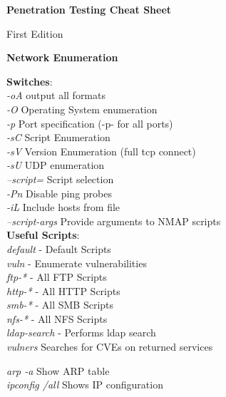 \documentclass[a4paper,10pt]{article}
\begin{document}
\centering
\begin{tcolorbox}[width=0.75\linewidth]
	\huge
	\centering
	\textbf{Penetration Testing Cheat Sheet}
\end{tcolorbox}
\vfill
\begin{tcolorbox}[width=0.6\linewidth]
	\centering
	\large
	First Edition
\end{tcolorbox}
\clearpage
\Huge{\textbf{Network Enumeration}}
\newline
\normalsize
\begin{multicols}{2}
\begin{tcolorbox}[breakable, title=Nmap]
\textbf{Switches}:\\
\textit{-oA} output all formats\\
\textit{-O} Operating System enumeration\\
\textit{-p} Port specification (-p- for all ports)\\
\textit{-sC} Script Enumeration\\
\textit{-sV} Version Enumeration (full tcp connect)\\
\textit{-sU} UDP enumeration\\
\textit{--script=} Script selection\\
\textit{-Pn} Disable ping probes\\
\textit{-iL} Include hosts from file\\
\textit{--script-args} Provide arguments to NMAP scripts\\
\newline
\textbf{Useful Scripts}:\\
\textit{default} - Default Scripts\\
\textit{vuln} - Enumerate vulnerabilities\\
\textit{ftp-*} - All FTP Scripts\\
\textit{http-*} - All HTTP Scripts\\
\textit{smb-*} - All SMB Scripts\\
\textit{nfs-*} - All NFS Scripts\\
\textit{ldap-search} - Performs ldap search\\
\textit{vulners} Searches for CVEs on returned services\\
\end{tcolorbox}
\begin{tcolorbox}[breakable, title=Windows commands]
\textit{arp -a} Show ARP table\\
\textit{ipconfig /all} Shows IP configuration\\

\end{tcolorbox}
\end{multicols}
\end{document}
